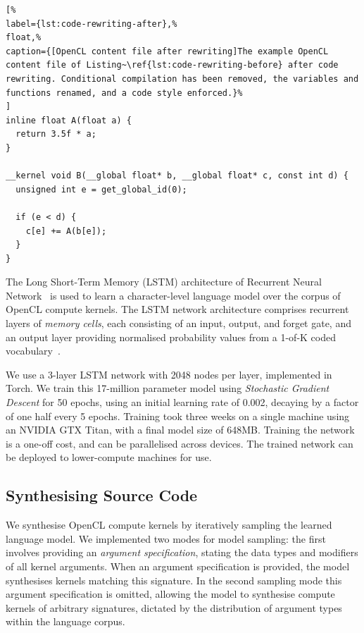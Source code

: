 \lstset{language=[OpenCL]C}
\begin{lstlisting}[%
label={lst:code-rewriting-after},%
float,%
caption={[OpenCL content file after rewriting]The example OpenCL content file of Listing~\ref{lst:code-rewriting-before} after code rewriting. Conditional compilation has been removed, the variables and functions renamed, and a code style enforced.}%
]
inline float A(float a) {
  return 3.5f * a;
}

__kernel void B(__global float* b, __global float* c, const int d) {
  unsigned int e = get_global_id(0);

  if (e < d) {
    c[e] += A(b[e]);
  }
}
\end{lstlisting}

The Long Short-Term Memory (LSTM) architecture of Recurrent Neural Network~\cite{Sundermeyer2012,Mikolov2015} is used to learn a character-level language model over the corpus of OpenCL compute kernels. The LSTM network architecture comprises recurrent layers of \emph{memory cells}, each consisting of an input, output, and forget gate, and an output layer providing normalised probability values from a 1-of-K coded vocabulary~\cite{Graves}.

We use a 3-layer LSTM network with 2048 nodes per layer, implemented in Torch. We train this 17-million parameter model using \textit{Stochastic Gradient Descent} for 50 epochs, using an initial learning rate of 0.002, decaying by a factor of one half every 5 epochs. Training took three weeks on a single machine using an NVIDIA GTX Titan, with a final model size of 648MB. Training the network is a one-off cost, and can be parallelised across devices. The trained network can be deployed to lower-compute machines for use.

\subsection{Synthesising Source Code}
\label{subsec:synthesizing-opencl}

We synthesise OpenCL compute kernels by iteratively sampling the learned language model. We implemented two modes for model sampling: the first involves providing an \emph{argument specification}, stating the data types and modifiers of all kernel arguments. When an argument specification is provided, the model synthesises kernels matching this signature. In the second sampling mode this argument specification is omitted, allowing the model to synthesise compute kernels of arbitrary signatures, dictated by the distribution of argument types within the language corpus.

